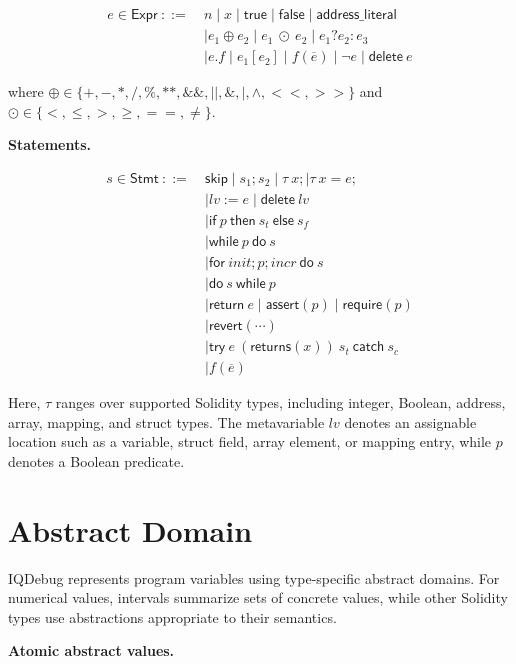 \documentclass[11pt,oneside]{report}
\theoremstyle{plain}
\theoremstyle{definition}
\theoremstyle{remark}
\begin{document}
\begin{align*}
e \in \mathsf{Expr}\ ::=\ &
n
\mid x
\mid \mathsf{true}
\mid \mathsf{false}
\mid \mathsf{address\_literal} \\
& \mid e_1 \oplus e_2
\mid e_1\ \odot\ e_2
\mid e_1 ? e_2 : e_3 \\
& \mid e.f
\mid e_1[e_2]
\mid f(\overline{e})
\mid \neg e
\mid \mathsf{delete}\ e
\end{align*}

where
\(\oplus \in \{+,-,*,/,\%,**,\&\&,||,\&,|,\wedge,<<,>>\}\)
and
\(\odot \in \{<,\le,>,\ge,==,\ne\}\).

\noindent\textbf{Statements.}

\begin{align*}
s \in \mathsf{Stmt}\ ::=\ &
\mathsf{skip}
\mid s_1;s_2
\mid \tau\ x;
\mid \tau\ x=e; \\
& \mid lv := e
\mid \mathsf{delete}\ lv \\
& \mid \mathsf{if}\ p\ \mathsf{then}\ s_t\ \mathsf{else}\ s_f \\
& \mid \mathsf{while}\ p\ \mathsf{do}\ s \\
& \mid \mathsf{for}\ init;p;incr\ \mathsf{do}\ s \\
& \mid \mathsf{do}\ s\ \mathsf{while}\ p \\
& \mid \mathsf{return}\ e
\mid \mathsf{assert}(p)
\mid \mathsf{require}(p) \\
& \mid \mathsf{revert}(\cdots) \\
& \mid \mathsf{try}\ e\ (\mathsf{returns}(x))\ s_t\ \mathsf{catch}\ s_c \\
& \mid f(\overline{e})
\end{align*}

Here, \(\tau\) ranges over supported Solidity types, including integer, Boolean, address, array, mapping, and struct types.
The metavariable \(lv\) denotes an assignable location such as a variable, struct field, array element, or mapping entry, while \(p\) denotes a Boolean predicate.

\section{Abstract Domain}

IQDebug represents program variables using type-specific abstract domains.
For numerical values, intervals summarize sets of concrete values, while other Solidity types use abstractions appropriate to their semantics.

\noindent\textbf{Atomic abstract values.}
\end{document}
